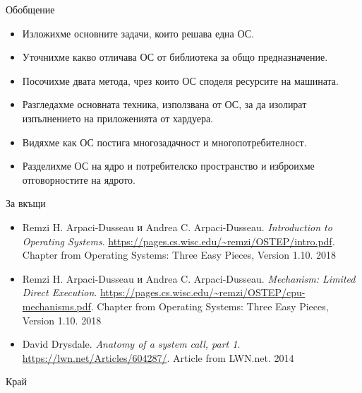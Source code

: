 \documentclass[14pt, aspectratio=169]{beamer}
\begin{document}
\begin{frame}{Обобщение}
  \begin{itemize}
    \item Изложихме основните задачи, които решава една ОС.
    \item Уточнихме какво отличава ОС от библиотека за общо предназначение.
    \item Посочихме двата метода, чрез които ОС споделя ресурсите на машината.
    \item Разгледахме основната техника, използвана от ОС, за да изолират
      изпълнението на приложенията от хардуера.
    \item Видяхме как ОС постига многозадачност и многопотребителност.
    \item Разделихме ОС на ядро и потребителско пространство и изброихме
      отговорностите на ядрото.
  \end{itemize}
\end{frame}

\begin{frame}{За вкъщи}
  \footnotesize
  \begin{itemize}[<1->]
    \item \textcolor{tuesnavy}{Remzi H. Arpaci-Dusseau и Andrea C. Arpaci-Dusseau}.
      \emph{Introduction to Operating Systems}.
      {\color{bibnote}\url{https://pages.cs.wisc.edu/~remzi/OSTEP/intro.pdf}.
        Chapter from Operating Systems: Three Easy Pieces, Version 1.10. 2018}
    \item \textcolor{tuesnavy}{Remzi H. Arpaci-Dusseau и Andrea C. Arpaci-Dusseau}.
      \emph{Mechanism: Limited Direct Execution}.
      {\color{bibnote}\url{https://pages.cs.wisc.edu/~remzi/OSTEP/cpu-mechanisms.pdf}.
        Chapter from Operating Systems: Three Easy Pieces, Version 1.10. 2018}
    \item \textcolor{tuesnavy}{David Drysdale}. \emph{Anatomy of a system call, part 1}.
      {\color{bibnote}\url{https://lwn.net/Articles/604287/}. Article from
        LWN.net. 2014}
  \end{itemize}
\end{frame}

\begin{frame}
  \Large Край
\end{frame}
\end{document}
